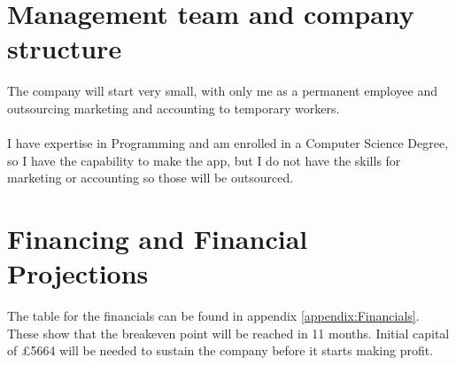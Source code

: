 \documentclass{article}[18pt]
\begin{document}
\section{Management team and company structure}
The company will start very small, with only me as a permanent employee and outsourcing marketing and accounting to temporary workers.\\
\\
I have expertise in Programming and am enrolled in a Computer Science Degree, so I have the capability to make the app, but I do not have the skills for marketing or accounting so those will be outsourced.
\section{Financing and Financial Projections}
The table for the financials can be found in appendix \ref{appendix:Financials}. These show that the breakeven point will be reached in 11 months. Initial capital of £5664 will be needed to sustain the company before it starts making profit.
\end{document}
